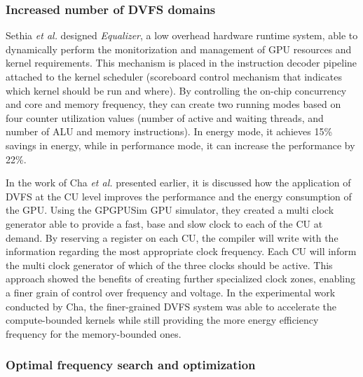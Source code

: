 \subsubsection{Increased number of DVFS domains}


Sethia \textit{et al.} \cite{sethia_equalizer:_2014} designed \textit{Equalizer}, a low overhead hardware runtime system, able to dynamically perform the monitorization and management of GPU resources and kernel requirements. This mechanism is placed in the instruction decoder pipeline attached to the kernel scheduler (scoreboard control mechanism that indicates which kernel should be run and where). By controlling the on-chip concurrency and core and memory frequency, they can create two running modes based on four counter utilization values (number of active and waiting threads, and number of ALU and memory instructions). In energy mode, it achieves 15\% savings in energy, while in performance mode, it can increase the performance by 22\%.

In the work of Cha \textit{et al.} \cite{cha_core-level_2018} presented earlier, it is discussed how the application of DVFS at the CU level improves the performance and the energy consumption of the GPU. Using the GPGPUSim GPU simulator, they created a multi clock generator able to provide a fast, base and slow clock to each of the CU at demand.  By reserving a register on each CU, the compiler will write with the information regarding the most appropriate clock frequency. Each CU will inform the multi clock generator of which of the three clocks should be active. This approach showed the benefits of creating further specialized clock zones, enabling a finer grain of control over frequency and voltage. In the experimental work conducted by Cha, the finer-grained DVFS system was able to accelerate the compute-bounded kernels while still providing the more energy efficiency frequency for the memory-bounded ones.

\subsubsection{Optimal frequency search and optimization}

